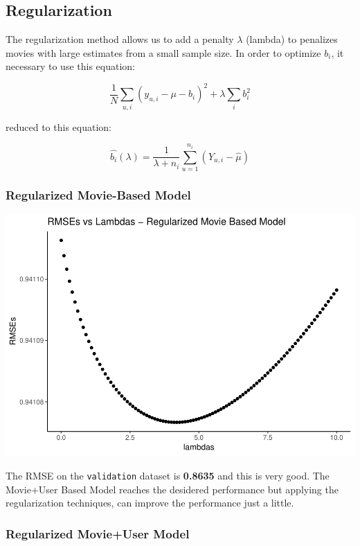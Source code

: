 \documentclass[]{article}
\begin{document}
\hypertarget{regularization}{%
\subsection{Regularization}\label{regularization}}

The regularization method allows us to add a penalty \(\lambda\)
(lambda) to penalizes movies with large estimates from a small sample
size. In order to optimize \(b_i\), it necessary to use this equation:

\[\frac{1}{N} \sum_{u,i} (y_{u,i} - \mu - b_{i})^{2} + \lambda \sum_{i} b_{i}^2\]

reduced to this equation:

\[\hat{b_{i}} (\lambda) = \frac{1}{\lambda + n_{i}} \sum_{u=1}^{n_{i}} (Y_{u,i} - \hat{\mu}) \]

\hypertarget{regularized-movie-based-model}{%
\subsubsection{Regularized Movie-Based
Model}\label{regularized-movie-based-model}}

\begin{center}\includegraphics{MovieLens_Project_Report_files/figure-latex/unnamed-chunk-37-1} \end{center}

The RMSE on the \texttt{validation} dataset is \textbf{0.8635} and this
is very good. The Movie+User Based Model reaches the desidered
performance but applying the regularization techniques, can improve the
performance just a little.

\hypertarget{regularized-movieuser-model}{%
\subsubsection{Regularized Movie+User
Model}\label{regularized-movieuser-model}}
\end{document}
